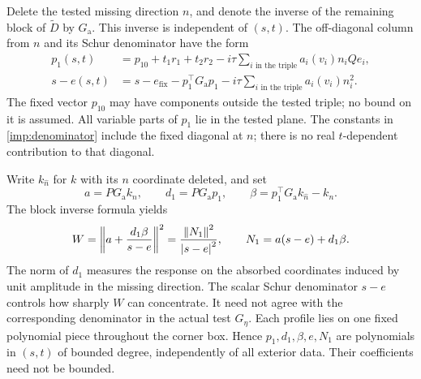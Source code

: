 Delete the tested missing direction $n$, and denote the inverse of the
remaining block of $\widetilde D$ by $G_{\mathrm a}$. This inverse is
independent of $(s,t)$. The off-diagonal column from $n$ and its Schur
denominator have the form
\begin{align}
 p_1(s,t)&=p_{10}+t_1r_1+t_2r_2
       -i\tau\sum_{i\text{ in the triple}}a_i(v_i)n_iQe_i,
 \label{imp:p1}\\
 s-e(s,t)&=s-e_{\mathrm{fix}}
       -p_1^\top G_{\mathrm a}p_1
       -i\tau\sum_{i\text{ in the triple}}a_i(v_i)n_i^2.
 \label{imp:denominator}
\end{align}
The fixed vector $p_{10}$ may have components outside the tested triple;
no bound on it is assumed. All variable parts of $p_1$ lie in the tested
plane. The constants in \cref{imp:denominator} include the fixed diagonal
at $n$; there is no real $t$-dependent contribution to that diagonal.

Write $k_{\widehat n}$ for $k$ with its $n$ coordinate deleted, and set
\begin{equation}
 a=PG_{\mathrm a}k_{\widehat n},\qquad
 d_1=PG_{\mathrm a}p_1,\qquad
 \beta=p_1^\top G_{\mathrm a}k_{\widehat n}-k_n.
 \label{imp:adb}
\end{equation}
The block inverse formula yields
\begin{equation}
 W=\left\lVert a+\frac{d_1\beta}{s-e}\right\rVert^2
   =\frac{\left\lVert N_1\right\rVert^2}{\left\lvert s-e\right\rvert^2},
 \qquad N_1=a(s-e)+d_1\beta.
 \label{imp:W}
\end{equation}
The norm of $d_1$ measures the response on the absorbed coordinates
induced by unit amplitude in the missing direction. The scalar Schur
denominator $s-e$ controls how sharply $W$ can concentrate. It need not agree with
the corresponding denominator in the actual test $G_\eta$.
Each profile lies on one fixed polynomial piece throughout the corner
box. Hence $p_1,d_1,\beta,e,N_1$ are polynomials in $(s,t)$ of bounded
degree, independently of all exterior data. Their coefficients need not
be bounded.

